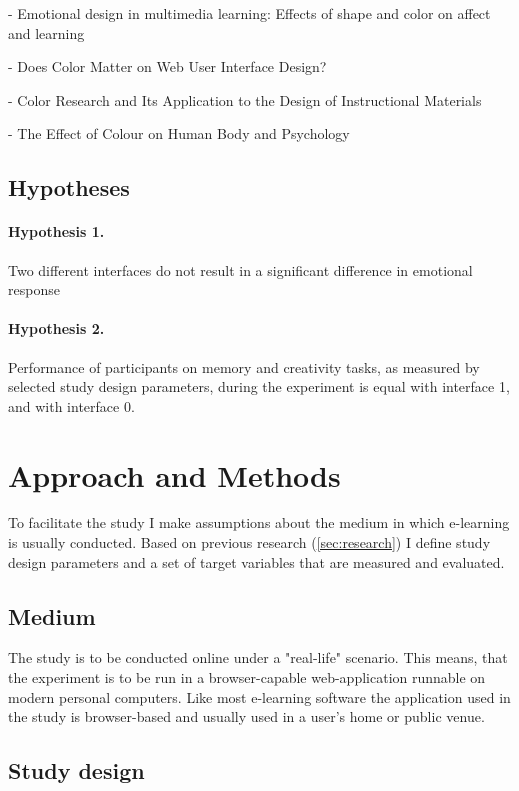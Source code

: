 		\cite{Plass2014} - Emotional design in multimedia learning: Effects of shape and color on affect and learning
		
		\cite{Swasty2017} - Does Color Matter on Web User Interface Design?
		
		\cite{Pert1996} - Color Research and Its Application to the Design of Instructional Materials
		
		\cite{Tekirdag2015} - The Effect of Colour on Human Body and Psychology
	
	\subsection{Hypotheses}
	
		\paragraph{Hypothesis 1.} Two different interfaces do not result in a significant difference in emotional response
		\paragraph{Hypothesis 2.} Performance of participants on memory and creativity tasks, as measured by selected study design parameters, during the experiment is equal with interface 1, and with interface 0.

\section{Approach and Methods}

To facilitate the study I make assumptions about the medium in which e-learning is usually conducted. Based on previous research (\ref{sec:research}) I define study design parameters and a set of target variables that are measured and evaluated.

	\subsection{Medium}
	
	The study is to be conducted online under a "real-life" scenario. This means, that the experiment is to be run in a browser-capable web-application runnable on modern personal computers. Like most e-learning software the  application used in the study is browser-based and usually used in a user's home or public venue.
	
	\subsection{Study design} \label{sec:study-design}
	
